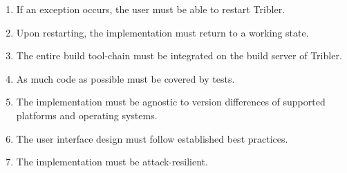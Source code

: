 \begin{enumerate}[label=B\arabic*.,ref=req. B\arabic*]
	\item If an exception occurs, the user must be able to restart Tribler.
	\item Upon restarting, the implementation must return to a working state.
	\item The entire build tool-chain must be integrated on the build server of Tribler. %
	\item As much code as possible must be covered by tests.
	\item The implementation must be agnostic to version differences of supported platforms and operating systems.
	\item The user interface design must follow established best practices.%
	\item The implementation must be attack-resilient.

\end{enumerate}


